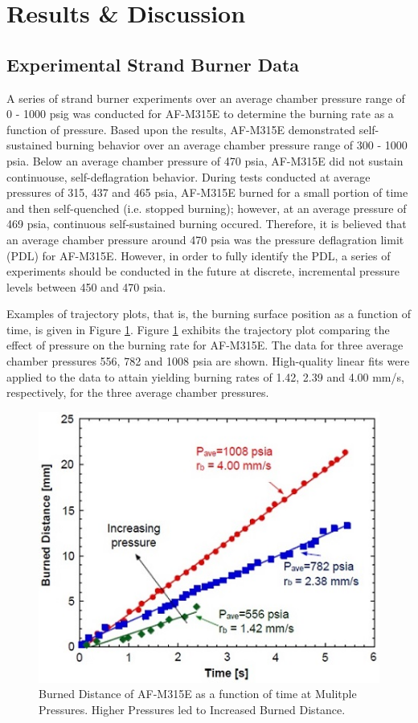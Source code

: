 \documentclass{article}
\begin{document}
\section{Results \& Discussion} \label{results}

\subsection{Experimental Strand Burner Data} \label{resultsExpr}

A series of strand burner experiments over an average chamber pressure range of 0 - 1000 psig was conducted for 
AF-M315E to determine the burning rate as a function of pressure. Based upon the results, AF-M315E demonstrated
self-sustained burning behavior over an average chamber pressure range of 300 - 1000 psia. Below an average 
chamber pressure of 470 psia, AF-M315E did not sustain continuouse, self-deflagration behavior. During tests
conducted at average pressures of 315, 437 and 465 psia, AF-M315E burned for a small portion of time and then
self-quenched (i.e. stopped burning); however, at an average pressure of 469 psia, continuous self-sustained
burning occured. Therefore, it is believed that an average chamber pressure around 470 psia was the pressure
deflagration limit (PDL) for AF-M315E. However, in order to fully identify the PDL, a series of experiments 
should be conducted in the future at discrete, incremental pressure levels between 450 and 470 psia.

Examples of trajectory plots, that is, the burning surface position as a function of time, is given in Figure
\ref{fig6}. Figure \ref{fig6} exhibits the trajectory plot comparing the effect of pressure on the burning rate
for AF-M315E. The data for three average chamber pressures 556, 782 and 1008 psia are shown. High-quality linear
fits were applied to the data to attain yielding burning rates of 1.42, 2.39 and 4.00 mm/s, respectively, for
the three average chamber pressures.

\begin{figure}[htb!]
\centering
\includegraphics[width=0.25\textheight]{Figure_6.jpg}
\caption{Burned Distance of AF-M315E as a function of time at Mulitple Pressures. Higher Pressures led to Increased Burned Distance.}
\label{fig6}
\end{figure}
\end{document}
